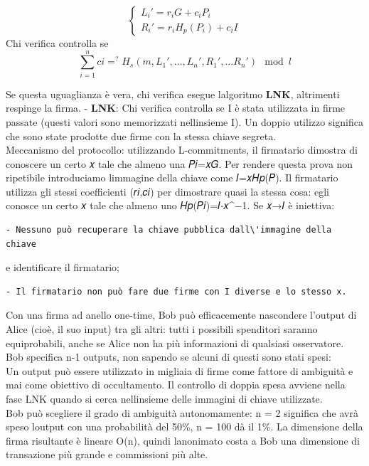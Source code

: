 \documentclass[
]{article}
\begin{document}
\[ \begin{cases}
L_i' = r_iG + c_iP_i \\
R_i' = r_iH_p(P_i) + c_iI
\end{cases}
 \] Chi verifica controlla se
\[\sum_{i=1}^{n} ci =^? H_s(m,L_1',...,L_n',R_1',...R_n') \mod l \]

Se questa uguaglianza è vera, chi verifica esegue
l\textquotesingle algoritmo \textbf{LNK}, altrimenti respinge la firma.
- \textbf{LNK}: Chi verifica controlla se I è stata utilizzata in firme
passate (questi valori sono memorizzati nell\textquotesingle insieme I).
Un doppio utilizzo significa che sono state prodotte due firme con la
stessa chiave segreta.\\
Meccanismo del protocollo: utilizzando L-commitments, il firmatario
dimostra di conoscere un certo 𝑥 tale che almeno una 𝑃𝑖=𝑥𝐺. Per rendere
questa prova non ripetibile introduciamo l\textquotesingle immagine
della chiave come 𝐼=𝑥𝐻𝑝(𝑃). Il firmatario utilizza gli stessi
coefficienti (𝑟𝑖,𝑐𝑖) per dimostrare quasi la stessa cosa: egli conosce
un certo 𝑥 tale che almeno uno 𝐻𝑝(𝑃𝑖)=𝐼⋅𝑥\^{}−1. Se 𝑥→𝐼 è iniettiva:

\begin{verbatim}
- Nessuno può recuperare la chiave pubblica dall\'immagine della chiave
\end{verbatim}

e identificare il firmatario;

\begin{verbatim}
- Il firmatario non può fare due firme con I diverse e lo stesso x.
\end{verbatim}

Con una firma ad anello one-time, Bob può efficacemente nascondere
l'output di Alice (cioè, il suo input) tra gli altri: tutti i possibili
spenditori saranno equiprobabili, anche se Alice non ha più informazioni
di qualsiasi osservatore. Bob specifica n-1 outputs, non sapendo se
alcuni di questi sono stati spesi:\\
Un output può essere utilizzato in migliaia di firme come fattore di
ambiguità e mai come obiettivo di occultamento. Il controllo di doppia
spesa avviene nella fase LNK quando si cerca
nell\textquotesingle insieme delle immagini di chiave utilizzate.\\
Bob può scegliere il grado di ambiguità autonomamente: n = 2 significa
che avrà speso l\textquotesingle output con una probabilità del 50\%, n
= 100 dà il 1\%. La dimensione della firma risultante è lineare O(n),
quindi l\textquotesingle anonimato costa a Bob una dimensione di
transazione più grande e commissioni più alte.
\end{document}

